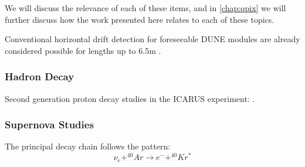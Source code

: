 We will discuss the relevance of each of these items, and in \ref{chap:qpix} we will further discuss how the work presented here relates to each of these topics. 


Conventional horizontal drift detection for foreseeable DUNE modules are already considered possible for lengths up to 6.5m \citep{DUNE_Vertical:Paulucci_2022}.


\subsubsection{Hadron Decay}
\label{sect:intro_decay}

Second generation proton decay studies in the ICARUS experiment: \citep{ICARUS_2001}.


\subsubsection{Supernova Studies}
\label{sect:intro_supernova}

The principal decay chain follows the pattern:
\begin{equation}
    \nu_{e} + ^{40}Ar \rightarrow e^- + ^{40}Kr^*
\end{equation}


